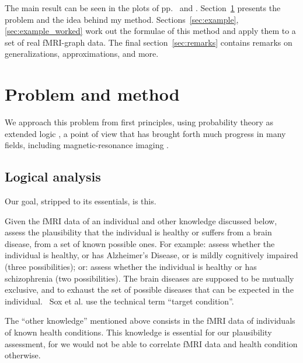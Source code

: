 \documentclass[\ifafour a4paper,12pt,\else a5paper,10pt,\fi%
onecolumn,oneside,article,%
british%
]{memoir}
\theoremstyle{remark}
\theoremstyle{innote}
\newcommand*{\citep}{\parencites}
\newcommand*{\citey}{\parencites*}
\renewcommand*{\|}{\mathpunct{|}}
\newcommand*{\etal}{{et al.}}
\newcommand*{\puzzle}{\maltese}
\newcommand{\mynote}[1]{ {\footnotesize\color{notecolour}\puzzle\ #1} }
\theoremstyle{plain}
\begin{document}
The main result can be seen in the
plots of pp.~\pageref{results_regions} and
\pageref{results_regions_old}. Section~\ref{sec:problem} presents the
problem and the idea behind my method. Sections~\ref{sec:example},
\ref{sec:example_worked} work out the formulae of this method and apply
them to a set of real fMRI-graph data. The final section~\ref{sec:remarks}
contains remarks on generalizations, approximations, and more.

\section{Problem and method}
\label{sec:problem}

We approach this problem from first principles, using probability theory as
extended logic \citep{jaynes1994_r2003}, a point of view that has brought
forth much progress in many fields, including magnetic-resonance imaging
\citep{bretthorst1990}.

\subsection{Logical analysis}
\label{sec:logical_analysis}

Our goal, stripped to its essentials, is this.

Given the fMRI data of an individual and other knowledge discussed below,
assess the plausibility that the individual is healthy or suffers from a
brain disease, from a set of known possible ones. For example: assess
whether the individual is healthy, or has Alzheimer's Disease, or is mildly
cognitively impaired (three possibilities); or: assess whether the
individual is healthy or has schizophrenia (two possibilities). The brain
diseases are supposed to be mutually exclusive, and to exhaust the set of
possible diseases that can be expected in the individual. \mynote{Sox \etal
  \citey{soxetal1988_r2013} use the technical term \enquote{target
  condition}.}

The \enquote{other knowledge} mentioned above consists in the
fMRI data of individuals of known health conditions. This knowledge is
essential for our plausibility assessment, for we would not be able to
correlate fMRI data and health condition otherwise.
\end{document}
